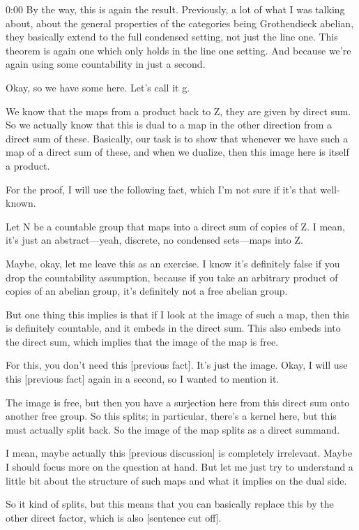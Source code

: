 \begin{unfinished}{0:00}
By the way, this is again the result. Previously, a lot of what I was talking about, about the general properties of the categories being Grothendieck abelian, they basically extend to the full condensed setting, not just the line one. This theorem is again one which only holds in the line one setting. And because we're again using some countability in just a second.

Okay, so we have some here. Let's call it g.

We know that the maps from a product back to Z, they are given by direct sum. So we actually know that this is dual to a map in the other direction from a direct sum of these. Basically, our task is to show that whenever we have such a map of a direct sum of these, and when we dualize, then this image here is itself a product.

For the proof, I will use the following fact, which I'm not sure if it's that well-known.

Let N be a countable group that maps into a direct sum of copies of Z. I mean, it's just an abstract---yeah, discrete, no condensed sets---maps into Z.

Maybe, okay, let me leave this as an exercise. I know it's definitely false if you drop the countability assumption, because if you take an arbitrary product of copies of an abelian group, it's definitely not a free abelian group.

But one thing this implies is that if I look at the image of such a map, then this is definitely countable, and it embeds in the direct sum. This also embeds into the direct sum, which implies that the image of the map is free.

For this, you don't need this [previous fact]. It's just the image. Okay, I will use this [previous fact] again in a second, so I wanted to mention it.

The image is free, but then you have a surjection here from this direct sum onto another free group. So this splits; in particular, there's a kernel here, but this must actually split back. So the image of the map splits as a direct summand.

I mean, maybe actually this [previous discussion] is completely irrelevant. Maybe I should focus more on the question at hand. But let me just try to understand a little bit about the structure of such maps and what it implies on the dual side.

So it kind of splits, but this means that you can basically replace this by the other direct factor, which is also [sentence cut off].


\end{unfinished}
